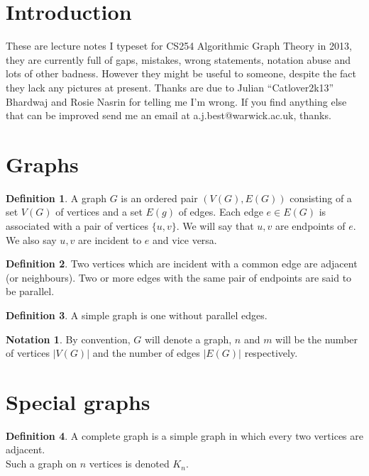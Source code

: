 \documentclass{article}
\theoremstyle{definition}
\newtheorem*{defn}{Definition}
\newtheorem*{nota}{Notation}
\begin{document}
\maketitle
\tableofcontents
\section*{Introduction}
These are lecture notes I typeset for CS254 Algorithmic Graph Theory in 2013, they are currently full of gaps, mistakes, wrong statements, notation abuse and lots of other badness.
However they might be useful to someone, despite the fact they lack any pictures at present.
Thanks are due to Julian ``Catlover2k13'' Bhardwaj and Rosie Nasrin for telling me I'm wrong.
If you find anything else that can be improved send me an email at a.j.best@warwick.ac.uk, thanks.
\clearpage

\section{Graphs}
\begin{defn}
A graph $G$ is an ordered pair $(V(G),E(G))$ consisting of a set $V(G)$ of vertices and a set $E(g)$ of edges.
Each edge $e\in E(G)$ is associated with a pair of vertices $\{u,v\}$.
We will say that $u,v$ are endpoints of $e$.
We also say $u,v$ are incident to $e$ and vice versa.
\end{defn}

\begin{defn}
Two vertices which are incident with a common edge are adjacent (or neighbours).
Two or more edges with the same pair of endpoints are said to be parallel.
\end{defn}

\begin{defn}
A simple graph is one without parallel edges.
\end{defn}

\begin{nota}
By convention, $G$ will denote a graph, $n$ and $m$ will be the number of vertices $|V(G)|$ and the number of edges $|E(G)|$ respectively.
\end{nota}

\section{Special graphs}
\begin{defn}
A complete graph is a simple graph in which every two vertices are adjacent. \\
Such a graph on $n$ vertices is denoted $K_n$.
\end{defn}
\end{document}
